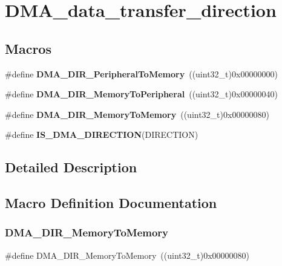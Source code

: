 \section{D\+M\+A\+\_\+data\+\_\+transfer\+\_\+direction}
\label{group__DMA__data__transfer__direction}
\subsection*{Macros}
\begin{DoxyCompactItemize}
\item 
\#define \textbf{ D\+M\+A\+\_\+\+D\+I\+R\+\_\+\+Peripheral\+To\+Memory}~((uint32\+\_\+t)0x00000000)
\item 
\#define \textbf{ D\+M\+A\+\_\+\+D\+I\+R\+\_\+\+Memory\+To\+Peripheral}~((uint32\+\_\+t)0x00000040)
\item 
\#define \textbf{ D\+M\+A\+\_\+\+D\+I\+R\+\_\+\+Memory\+To\+Memory}~((uint32\+\_\+t)0x00000080)
\item 
\#define \textbf{ I\+S\+\_\+\+D\+M\+A\+\_\+\+D\+I\+R\+E\+C\+T\+I\+ON}(D\+I\+R\+E\+C\+T\+I\+ON)
\end{DoxyCompactItemize}


\subsection{Detailed Description}


\subsection{Macro Definition Documentation}
\mbox{\label{group__DMA__data__transfer__direction_gafb7d5b786f2fb56a903936cdc6d5e89a}} 
\subsubsection{D\+M\+A\+\_\+\+D\+I\+R\+\_\+\+Memory\+To\+Memory}
{\footnotesize\ttfamily \#define D\+M\+A\+\_\+\+D\+I\+R\+\_\+\+Memory\+To\+Memory~((uint32\+\_\+t)0x00000080)}



